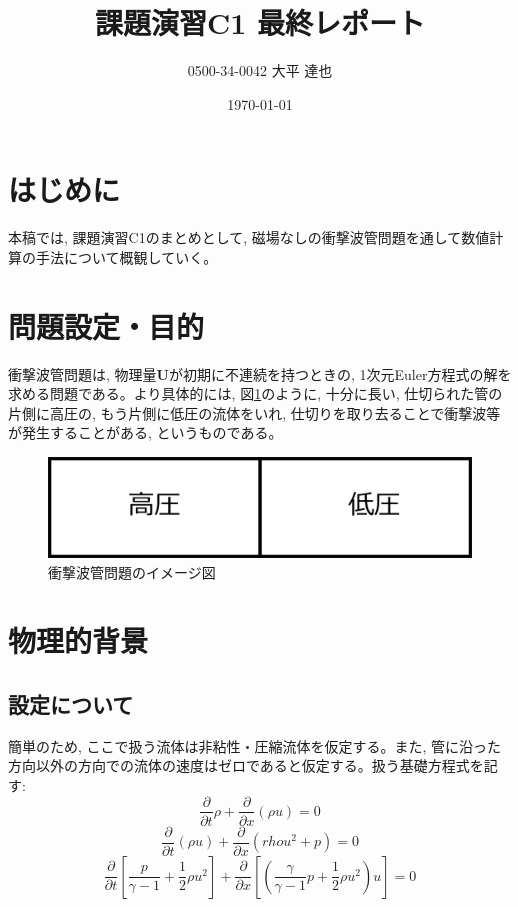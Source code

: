\documentclass[dvipdfmx,b5paper]{jsarticle}
\title{課題演習C1 最終レポート}
\author{0500-34-0042 \quad 大平 達也}
\date{\today}
\begin{document}
\maketitle

\section{はじめに}
本稿では, 課題演習C1のまとめとして, 磁場なしの衝撃波管問題を通して数値計算の手法について概観していく。

\section{問題設定・目的}
衝撃波管問題は, 物理量$\bm{U}$が初期に不連続を持つときの, 1次元Euler方程式の解を求める問題である。より具体的には, 図\ref{shocktube}のように, 十分に長い, 仕切られた管の片側に高圧の, もう片側に低圧の流体をいれ, 仕切りを取り去ることで衝撃波等が発生することがある, というものである。

\begin{figure}[H]
\centering
\includegraphics[width=0.4\linewidth]{fig/shocktube.png}
\caption{衝撃波管問題のイメージ図}
\label{shocktube}
\end{figure}

\section{物理的背景}
\subsection{設定について}
簡単のため, ここで扱う流体は非粘性・圧縮流体を仮定する。また, 管に沿った方向以外の方向での流体の速度はゼロであると仮定する。扱う基礎方程式を記す: 
\begin{equation}
  \frac{\partial}{\partial t}\rho+\frac{\partial}{\partial x}(\rho u)=0
\end{equation}
\begin{equation}
  \frac{\partial}{\partial t}(\rho u)+\frac{\partial}{\partial x}(rho u^2+p)=0
\end{equation}
\begin{equation}
  \frac{\partial}{\partial t}\left[\frac{p}{\gamma-1}+\frac{1}{2}\rho u^2\right]+\frac{\partial}{\partial x}\left[\left(\frac{\gamma}{\gamma-1}p+\frac{1}{2}\rho u^2\right)u\right]=0
\end{equation}
\end{document}
